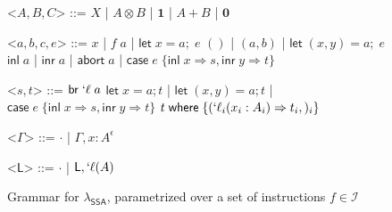 \documentclass[acmsmall,screen,review]{acmart}
\newcommand{\mc}[1]{\ensuremath{\mathcal{#1}}}
\newcommand{\ms}[1]{\ensuremath{\mathsf{#1}}}
\newcommand{\lbl}[1]{{`#1}}
\newcommand{\lto}{\Rightarrow}
\newcommand{\linl}[1]{\ms{inl}\;{#1}}
\newcommand{\linr}[1]{\ms{inr}\;{#1}}
\newcommand{\labort}[1]{\ms{abort}\;{#1}}
\newcommand{\letexpr}[3]{\ensuremath{\ms{let}\;#1 = #2;\;#3}}
\newcommand{\caseexpr}[5]{\ms{case}\;#1\;\{\linl{#2} \lto #3, \linr{#4} \lto #5\}}
\newcommand{\letstmt}[3]{\ensuremath{\ms{let}\;#1 = #2; #3}}
\newcommand{\brb}[2]{\ms{br}\;#1\;#2}
\newcommand{\lbrb}[2]{\brb{\lbl{#1}}{#2}}
\newcommand{\casestmt}[5]{\ms{case}\;#1\;\{\linl{#2} \lto #3, \linr{#4} \lto #5\}}
\newcommand{\where}[2]{#1\;\ms{where}\;\{#2\}}
\newcommand{\wbranch}[3]{#1(#2) \lto #3}
\newcommand{\lwbranch}[3]{\wbranch{\lbl{#1}}{#2}{#3}}
\newcommand{\thyp}[3]{#1 : {#2}^{#3}}
\newcommand{\lhyp}[2]{#1(#2)}
\newcommand{\llhyp}[2]{\lhyp{\lbl{#1}}{#2}}
\newcommand{\isotopessa}{\(\lambda_{\ms{SSA}}\)}
\begin{document}
\begin{figure}[H]
  \begin{center}
    \begin{grammar}
      <\(A, B, C\)> ::= 
      \(X\)
      \;|\; \(A \otimes B\)
      \;|\; \(\mathbf{1}\)
      \;|\; \(A + B\)
      \;|\; \(\mathbf{0}\)

      <\(a, b, c, e\)> ::= \(x\) 
      \;|\;  \(f\;a\)
      \;|\; \(\letexpr{x}{a}{e}\)
      \alt  \(()\)
      \;|\; \((a, b)\)
      \;|\; \(\letexpr{(x, y)}{a}{e}\)
      \alt  \(\linl{a}\) 
      \;|\; \(\linr{a}\)
      \;|\; \(\labort{a}\)
      \;|\; \(\caseexpr{e}{x}{s}{y}{t}\)
      
      <\(s, t\)> ::= \(\lbrb{\ell}{a}\) 
      \alt  \(\letstmt{x}{a}{t}\)
      \;|\; \(\letstmt{(x, y)}{a}{t}\)
      \;|\; \(\casestmt{e}{x}{s}{y}{t}\)
      \alt  \(\where{t}{(\lwbranch{\ell_i}{x_i: A_i}{t_i},)_i}\)

      <\(\Gamma\)> ::= \(\cdot\) \;|\; \(\Gamma, \thyp{x}{A}{\epsilon}\)

      <\(\ms{L}\)> ::= \(\cdot\) \;|\; \(\ms{L}, \llhyp{\ell}{A}\)
    \end{grammar}
  \end{center}
  \caption{Grammar for \isotopessa, parametrized over a set of instructions \(f \in \mc{I}\)}
  \label{fig:ssa-grammar}
\end{figure}
\end{document}
